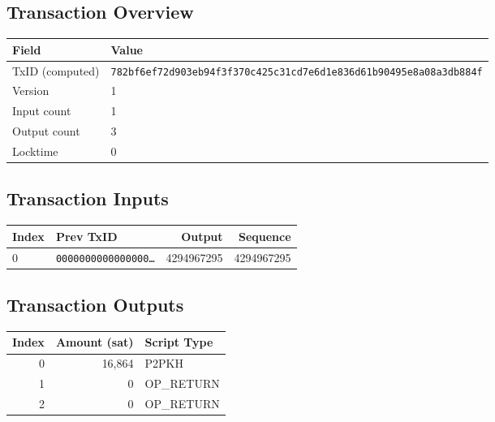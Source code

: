 \subsection*{Transaction Overview}
\begin{tabular}{@{}ll@{}} \toprule
Field & Value \\ \midrule
TxID (computed) & \texttt{782bf6ef72d903eb94f3f370c425c31cd7e6d1e836d61b90495e8a08a3db884f} \\
Version & 1 \\
Input count & 1 \\
Output count & 3 \\
Locktime & 0 \\
\bottomrule \end{tabular}

\subsection*{Transaction Inputs}
\begin{longtable}{@{}p{2cm}p{5cm}rr@{}} \toprule
Index & Prev TxID & Output & Sequence \\ \midrule
0 & \texttt{0000000000000000…} & 4294967295 & 4294967295 \\
\bottomrule \end{longtable}

\subsection*{Transaction Outputs}
\begin{longtable}{@{}rrl@{}} \toprule
Index & Amount (sat) & Script Type \\ \midrule
0 & 16,864 & P2PKH \\
1 & 0 & OP_RETURN \\
2 & 0 & OP_RETURN \\
\bottomrule \end{longtable}